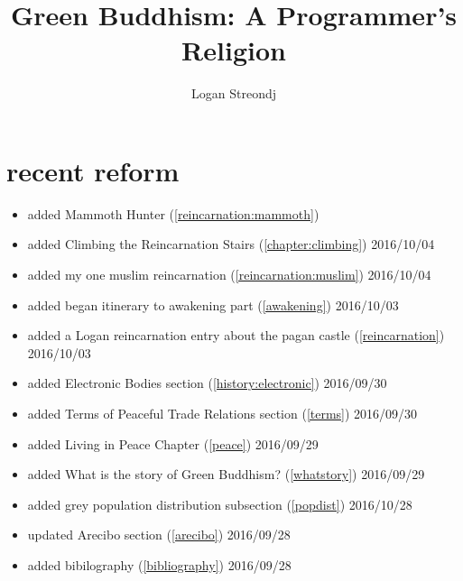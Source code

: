 \documentclass[10pt]{report}
\title{Green Buddhism: A Programmer's Religion}
\author{Logan Streondj \\
  \doclicenseName}
\begin{document}
\maketitle

\section{recent reform}
\begin{itemize}
  \item added Mammoth Hunter (\ref{reincarnation:mammoth})
  \item added Climbing the Reincarnation Stairs (\ref{chapter:climbing})
2016/10/04
  \item added my one muslim reincarnation (\ref{reincarnation:muslim})
2016/10/04
  \item added began itinerary to awakening part (\ref{awakening}) 2016/10/03
  \item added a Logan reincarnation entry about the pagan castle
(\ref{reincarnation}) 2016/10/03
  \item added Electronic Bodies section (\ref{history:electronic}) 2016/09/30
  \item added Terms of Peaceful Trade Relations section (\ref{terms}) 2016/09/30
  \item added Living in Peace Chapter (\ref{peace}) 2016/09/29
  \item added What is the story of Green Buddhism? (\ref{whatstory}) 2016/09/29
  \item added grey population distribution subsection (\ref{popdist})
2016/10/28
 \item updated Arecibo section (\ref{arecibo}) 2016/09/28
 \item added bibilography (\ref{bibliography}) 2016/09/28
\end{itemize}
\tableofcontents
 




\printbibliography{}
\label{bibliography}
\end{document}
